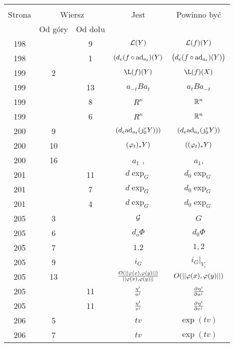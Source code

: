 \documentclass[a4paper,11pt]{article}
\begin{document}
\begin{center}
  \begin{tabular}{|c|c|c|c|c|}
    \hline
    & \multicolumn{2}{c|}{} & & \\
    Strona & \multicolumn{2}{c|}{Wiersz} & Jest
                              & Powinno być \\ \cline{2-3}
    & Od góry & Od dołu & & \\
    \hline
    198 & &  9 & $\mathcal{L}( Y )$ & $\mathcal{L}( f )( Y )$ \\
    198 & &  1 & $( d_{ e }( f \circ \mathrm{ad}_{ a_{ t } } )( Y )$
           & $\big( d_{ e }( f \circ \mathrm{ad}_{ a_{ t } } )( Y ) \big)$ \\
    199 & 2 & & $\L( f )( Y )$ & $\L( f )( X )$ \\
    199 & & 13 & $a_{ -t } B a_{ t }$ & $a_{ t } B a_{ -t }$ \\
    199 & &  8 & $R^{ n }$ & $\mathbb{R}^{ n }$ \\
    199 & &  6 & $R^{ n }$ & $\mathbb{R}^{ n }$ \\
    200 & 9 & & $( d_{ e }\mathrm{ad}_{ a_{ t } }( j^{ r }_{ 0 }Y ) ) )$
           & $( d_{ e }\mathrm{ad}_{ a_{ t } }( j^{ r }_{ 0 }Y ) )$ \\
    200 & 10 & & $( \varphi_{ t } )_{ * }Y )$ & $( ( \varphi_{ t } )_{ * }Y )$ \\
    200 & 16 & & $a_{ 1 }$ , & $a_{ 1 }$, \\
    201 & & 11 & $d \exp_{ G }$ & $d_{ 0 } \exp_{ G }$ \\
    201 & &  7 & $d \exp_{ G }$ & $d_{ 0 } \exp_{ G }$ \\
    201 & &  4 & $d \exp_{ G }$ & $d_{ 0 } \exp_{ G }$ \\
    205 &  3 & & $\mathcal{G}$ & $G$ \\
    205 &  6 & & $d_{ o }\Phi$ & $d_{ 0 }\Phi$ \\
    205 &  7 & & $1.2$ & $1, 2$ \\
    205 &  9 & & $i_{ G }$ & $i_{ G }|_{ V_{ i } }$ \\
    205 & 13 & & $\frac{ O( \left|\left|  \varphi( x ), \varphi( y )  \right|\right| ) }
                 { \left|\left|  \varphi( x ), \varphi( y )  \right|\right| }$
           & $O( \left|\left|  \varphi( x ), \varphi( y )  \right|\right| )$ \\
    205 & & 11 & $\frac{ \eta^{ i } }{ u^{ j } }$
           & $\frac{ \partial^{  } {  { \eta^{ i } }  } }{ \partial {  { u^{ j } }  }^{  } }$ \\
    205 & & 11 & $\frac{ \eta^{ i } }{ v^{ j } }$
           & $\frac{ \partial^{  } {  { \eta^{ i } }  } }{ \partial {  { v^{ j } }  }^{  } }$ \\
    206 &  5 & & $t v$ & $\exp( t v )$ \\
    206 &  7 & & $t v$ & $\exp( t v )$ \\

\end{tabular}
\end{center}
\end{document}
